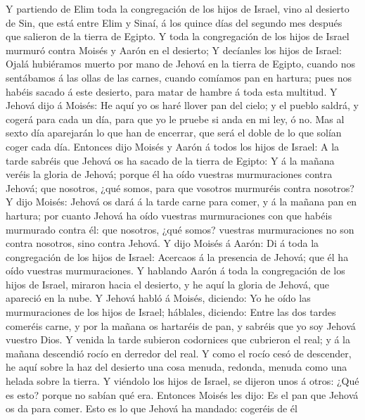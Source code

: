  Y partiendo de Elim toda la congregación de los hijos de
Israel, vino al desierto de Sin, que está entre Elim y Sinaí, á los
quince días del segundo mes después que salieron de la tierra de Egipto.
 Y toda la congregación de los hijos de Israel murmuró
contra Moisés y Aarón en el desierto;  Y decíanles los
hijos de Israel: Ojalá hubiéramos muerto por mano de Jehová en la tierra
de Egipto, cuando nos sentábamos á las ollas de las carnes, cuando
comíamos pan en hartura; pues nos habéis sacado á este desierto, para
matar de hambre á toda esta multitud.  Y Jehová dijo á
Moisés: He aquí yo os haré llover pan del cielo; y el pueblo saldrá, y
cogerá para cada un día, para que yo le pruebe si anda en mi ley, ó no.
 Mas al sexto día aparejarán lo que han de encerrar, que
será el doble de lo que solían coger cada día.  Entonces
dijo Moisés y Aarón á todos los hijos de Israel: A la tarde sabréis que
Jehová os ha sacado de la tierra de Egipto:  Y á la mañana
veréis la gloria de Jehová; porque él ha oído vuestras murmuraciones
contra Jehová; que nosotros, ¿qué somos, para que vosotros murmuréis
contra nosotros?  Y dijo Moisés: Jehová os dará á la tarde
carne para comer, y á la mañana pan en hartura; por cuanto Jehová ha
oído vuestras murmuraciones con que habéis murmurado contra él: que
nosotros, ¿qué somos? vuestras murmuraciones no son contra nosotros,
sino contra Jehová.  Y dijo Moisés á Aarón: Di á toda la
congregación de los hijos de Israel: Acercaos á la presencia de Jehová;
que él ha oído vuestras murmuraciones.  Y hablando Aarón
á toda la congregación de los hijos de Israel, miraron hacia el
desierto, y he aquí la gloria de Jehová, que apareció en la nube.
 Y Jehová habló á Moisés, diciendo:  Yo he
oído las murmuraciones de los hijos de Israel; háblales, diciendo: Entre
las dos tardes comeréis carne, y por la mañana os hartaréis de pan, y
sabréis que yo soy Jehová vuestro Dios.  Y venida la
tarde subieron codornices que cubrieron el real; y á la mañana descendió
rocío en derredor del real.  Y como el rocío cesó de
descender, he aquí sobre la haz del desierto una cosa menuda, redonda,
menuda como una helada sobre la tierra.  Y viéndolo los
hijos de Israel, se dijeron unos á otros: ¿Qué es esto? porque no sabían
qué era. Entonces Moisés les dijo: Es el pan que Jehová os da para
comer.  Esto es lo que Jehová ha mandado: cogeréis de él
